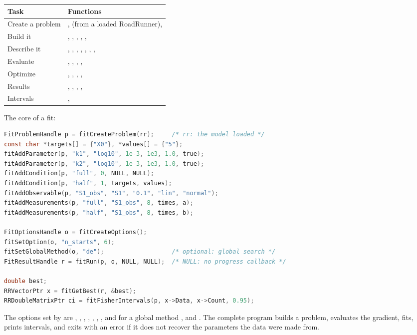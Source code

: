\begin{center}
\begin{tabularx}{\textwidth}{lY}
\toprule
Task & Functions \\
\midrule
Create a problem & ,  (from a loaded RoadRunner),
   \\
Build it & , , , ,
  ,  \\
Describe it & , , ,
  , , , ,
   \\
Evaluate & , , , ,
   \\
Optimize & , , , ,
   \\
Results & , , , ,
   \\
Intervals & ,  \\
\bottomrule
\end{tabularx}
\end{center}

The core of a fit:

\begin{lstlisting}[language=C]
FitProblemHandle p = fitCreateProblem(rr);     /* rr: the model loaded */
const char *targets[] = {"X0"}, *values[] = {"5"};
fitAddParameter(p, "k1", "log10", 1e-3, 1e3, 1.0, true);
fitAddParameter(p, "k2", "log10", 1e-3, 1e3, 1.0, true);
fitAddCondition(p, "full", 0, NULL, NULL);
fitAddCondition(p, "half", 1, targets, values);
fitAddObservable(p, "S1_obs", "S1", "0.1", "lin", "normal");
fitAddMeasurements(p, "full", "S1_obs", 8, times, a);
fitAddMeasurements(p, "half", "S1_obs", 8, times, b);

FitOptionsHandle o = fitCreateOptions();
fitSetOption(o, "n_starts", 6);
fitSetGlobalMethod(o, "de");                   /* optional: global search */
FitResultHandle r = fitRun(p, o, NULL, NULL);  /* NULL: no progress callback */

double best;
RRVectorPtr x = fitGetBest(r, &best);
RRDoubleMatrixPtr ci = fitFisherIntervals(p, x->Data, x->Count, 0.95);
\end{lstlisting}

The options set by  are , , , ,
, , , and for a global method ,  and
. The complete program  builds a problem, evaluates the gradient, fits,
prints intervals, and exits with an error if it does not recover the parameters the data were made from.
